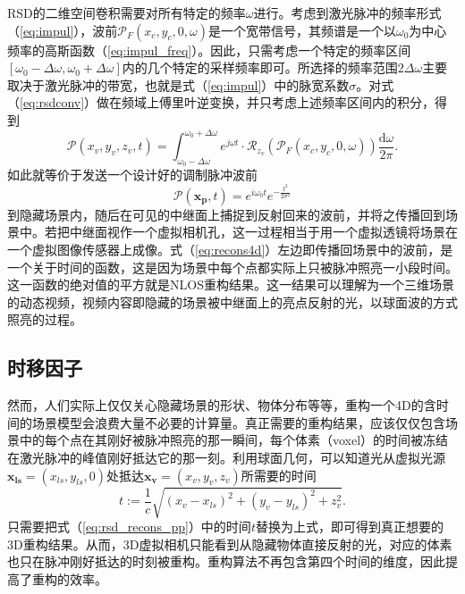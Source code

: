\documentclass[master]{shtthesis}             %
\begin{document}
RSD的二维空间卷积需要对所有特定的频率$\omega$进行。考虑到激光脉冲的频率形式（\ref{eq:impul}），波前$\mathcal{P}_F(x_c,y_c,0,\omega)$是一个宽带信号，其频谱是一个以$\omega_0$为中心频率的高斯函数（\ref{eq:impul_freq}）。因此，只需考虑一个特定的频率区间$[\omega_0-\Delta \omega, \omega_0+\Delta \omega]$内的几个特定的采样频率即可。所选择的频率范围$2\Delta\omega$主要取决于激光脉冲的带宽，也就是式（\ref{eq:impul}）中的脉宽系数$\sigma$。对式（\ref{eq:rsdconv}）做在频域上傅里叶逆变换，并只考虑上述频率区间内的积分，得到
\begin{equation}\label{eq:recons4d}
  \mathcal{P}(x_v,y_v,z_v,t)=\int_{\omega_0-\Delta \omega}^{\omega_0+\Delta \omega} e^{j\omega t}\cdot \mathcal{R}_{z_v}\left( \mathcal{P}_F(x_c,y_c,0,\omega) \right) \frac{\text{d}\omega}{2\pi} .
\end{equation}
如此就等价于发送一个设计好的调制脉冲波前
\begin{equation}
  \mathcal{P}(\mathbf{x_p},t)=e^{i\omega_0 t}e^{-\frac{t^2}{2\sigma^2}}
\end{equation} 
到隐藏场景内，随后在可见的中继面上捕捉到反射回来的波前，并将之传播回到场景中。若把中继面视作一个虚拟相机孔，这一过程相当于用一个虚拟透镜将场景在一个虚拟图像传感器上成像。式（\ref{eq:recons4d}）左边即传播回场景中的波前，是一个关于时间的函数，这是因为场景中每个点都实际上只被脉冲照亮一小段时间。这一函数的绝对值的平方就是NLOS重构结果。这一结果可以理解为一个三维场景的动态视频，视频内容即隐藏的场景被中继面上的亮点反射的光，以球面波的方式照亮的过程。

\subsection{时移因子}\label{sec:timeshift_factor}

然而，人们实际上仅仅关心隐藏场景的形状、物体分布等等，重构一个4D的含时间的场景模型会浪费大量不必要的计算量。真正需要的重构结果，应该仅仅包含场景中的每个点在其刚好被脉冲照亮的那一瞬间，每个体素（voxel）的时间被冻结在激光脉冲的峰值刚好抵达它的那一刻。利用球面几何，可以知道光从虚拟光源$\mathbf{x_{ls}}=(x_{ls},y_{ls},0)$处抵达$\mathbf{x_v}=(x_v,y_v,z_v)$所需要的时间
\begin{equation}\label{eq:trav_time}
  t := \frac{1}{c}\sqrt{(x_v-x_{ls})^2+(y_v-y_{ls})^2+z_v^2}.
\end{equation}  
只需要把式（\ref{eq:rsd_recons_pp}）中的时间$t$替换为上式，即可得到真正想要的3D重构结果。从而，3D虚拟相机只能看到从隐藏物体直接反射的光，对应的体素也只在脉冲刚好抵达的时刻被重构。重构算法不再包含第四个时间的维度，因此提高了重构的效率。
\end{document}
